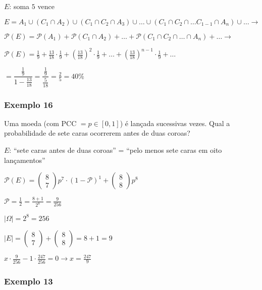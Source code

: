 \documentclass[a4paper]{article}
\begin{document}
	$E$: soma $5$ vence
	
	$E = A_{1} \cup (C_{1} \cap A_{2}) \cup (C_{1} \cap C_{2} \cap A_{3}) \cup \dots \cup(C_{1} \cap C_{2} \cap \dots C_{1-1} \cap A_{n}) \cup \dots \rightarrow$
	
	$\mathcal{P}(E) = \mathcal{P}(A_{1}) + \mathcal{P}(C_{1} \cap A_{2}) + \dots + \mathcal{P}(C_{1} \cap C_{2} \cap \dots \cap A_{n}) + \dots \rightarrow$
	
	$\mathcal{P}(E) = \frac{1}{9} + \frac{13}{18} \cdot \frac{1}{9} + (\frac{13}{18})^{2} \cdot \frac{1}{9} + \dots + (\frac{13}{18})^{n - 1} \cdot \frac{1}{9} + \dots$
	
	$= \dfrac{\frac{1}{9}}{1 - \frac{13}{18}} = \dfrac{\frac{1}{9}}{\frac{5}{18}} = \frac{2}{5} = 40\%$
	
	\subsubsection{Exemplo 16}
	
	\noindent Uma moeda (com PCC $= p \in [0,1]$) é lançada sucessivas vezes. Qual a probabilidade de sete caras ocorrerem antes de duas coroas?
	
	$E$: ``sete caras antes de duas coroas'' = ``pelo menos sete caras em oito lançamentos''
	
	$\mathcal{P}(E) = \begin{pmatrix}
	8 \\
	7
	\end{pmatrix} p^{7} \cdot (1 - \mathcal{P})^{1} + \begin{pmatrix}
	8 \\
	8
	\end{pmatrix} p^{8}$
	
	$\mathcal{P} = \frac{1}{2} = \frac{8 + 1}{2^{8}} = \frac{9}{256}$
	
	$|\varOmega| = 2^{8} = 256$
	
	$|E| = \begin{pmatrix}
	8 \\
	7
	\end{pmatrix} + \begin{pmatrix}
	8 \\
	8
	\end{pmatrix} = 8 + 1 = 9$
	
	$x \cdot \frac{9}{256} - 1 \cdot \frac{247}{256} = 0 \rightarrow x = \frac{247}{9}$
	
	\subsubsection{Exemplo 13}
	
\end{document}
